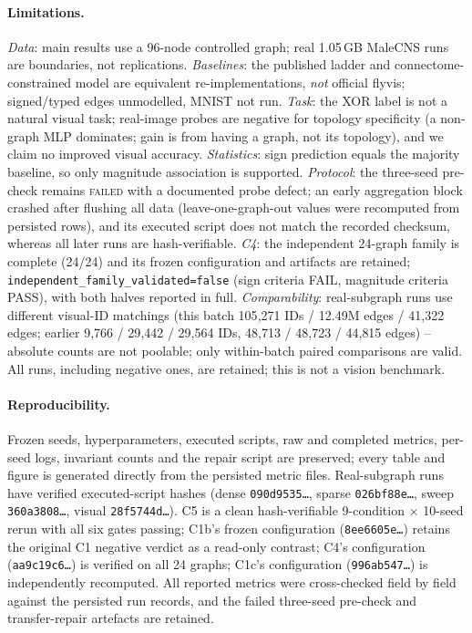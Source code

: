 \documentclass[10pt,twocolumn,letterpaper]{article}
\begin{document}
\paragraph{Limitations.}
\emph{Data}: main results use a 96-node controlled graph; real 1.05\,GB
MaleCNS runs are boundaries, not replications. \emph{Baselines}: the published
ladder and connectome-constrained model are equivalent re-implementations,
\emph{not} official flyvis; signed/typed edges unmodelled, MNIST not run.
\emph{Task}: the XOR label is not a natural visual task; real-image probes are
negative for topology specificity (a non-graph MLP dominates; gain is from
having a graph, not its topology), and we claim no improved visual accuracy.
\emph{Statistics}: sign prediction equals the majority baseline, so only
magnitude association is supported. \emph{Protocol}: the three-seed pre-check remains \textsc{failed} with a
documented probe defect; an early aggregation block crashed after flushing
all data (leave-one-graph-out values were recomputed from persisted rows),
and its executed script does not match the recorded checksum, whereas all
later runs are hash-verifiable. \emph{C4}: the independent 24-graph family
is complete (24/24) and its frozen configuration and artifacts are retained;
\texttt{independent\_family\_validated=false} (sign criteria FAIL, magnitude
criteria PASS), with both halves reported in full.
\emph{Comparability}: real-subgraph runs use different visual-ID matchings
(this batch 105{,}271 IDs / 12.49M edges / 41{,}322 edges; earlier 9{,}766 /
29{,}442 / 29{,}564 IDs, 48{,}713 / 48{,}723 / 44{,}815 edges) -- absolute
counts are not poolable; only within-batch paired comparisons are valid. All
runs, including negative ones, are retained; this is not a vision benchmark.

\paragraph{Reproducibility.}
Frozen seeds, hyperparameters, executed scripts, raw and completed metrics,
per-seed logs, invariant counts and the repair script are preserved; every
table and figure is generated directly from the persisted metric files.
Real-subgraph runs have verified executed-script hashes (dense
\texttt{090d9535\ldots}, sparse \texttt{026bf88e\ldots}, sweep
\texttt{360a3808\ldots}, visual \texttt{28f5744d\ldots}). C5 is a clean
hash-verifiable 9-condition $\times$ 10-seed rerun with all six gates passing;
C1b's frozen configuration (\texttt{8ee6605e\ldots}) retains the original C1
negative verdict as a read-only contrast; C4's configuration
(\texttt{aa9c19c6\ldots}) is verified on all 24 graphs; C1c's configuration
(\texttt{996ab547\ldots}) is independently recomputed. All reported metrics
were cross-checked field by field against the persisted run records, and the
failed three-seed pre-check and transfer-repair artefacts are retained.
\end{document}
